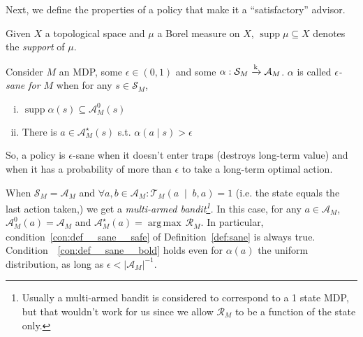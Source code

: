 \documentclass[anon,12pt]{colt2018} %
\DeclareMathOperator{\Supp}{supp}
\newcommand{\AP}[1]{\left(#1\right)}
\newcommand{\APM}[2]{\left(#1\;\middle\vert\;#2\right)}
\newcommand{\Argmax}[1]{\underset{#1}{\operatorname{arg\,max}}\,}
\newcommand{\Abs}[1]{\left\vert #1 \right\vert}
\newcommand{\K}{\xrightarrow{\textnormal{k}}}
\newcommand{\A}{\mathcal{A}}
\newcommand{\St}{\mathcal{S}}
\newcommand{\T}{\mathcal{T}}
\newcommand{\R}{\mathcal{R}}
\newcommand{\Ad}{\alpha}
\begin{document}
Next, we define the properties of a policy that make it a \enquote{satisfactory} advisor.

Given $X$ a topological space and $\mu$ a Borel measure on $X$, $\Supp{\mu} \subseteq X$ denotes the \emph{support} of $\mu$.

\begin{samepage}
\begin{definition}
\label{def:sane}

Consider $M$ an MDP, some $\epsilon\in(0,1)$ and some $\Ad: \St_M \K \A_M$. $\Ad$ is called \emph{$\epsilon$-sane for $M$} when for any $s \in \St_M$,

\begin{enumerate}[i.]
\item\label{con:def__sane__safe} $\Supp{\Ad(s)} \subseteq \A_M^0\AP{s}$
\item\label{con:def__sane__bold} There is $a \in \A_M^\star(s)$ s.t. $\Ad(a \mid s) > \epsilon$
\end{enumerate}

So, a policy is $\epsilon$-sane when it doesn't enter traps (destroys long-term value) and when it has a probability of more than $\epsilon$ to take a long-term optimal action.

\end{definition}
\end{samepage}

\begin{samepage}
\begin{example}

When $\St_M=\A_M$ and $\forall a,b \in \A_M: \T_M\APM{a}{b,a}=1$ (i.e. the state equals the last action taken,) we get a \emph{multi-armed bandit\footnote{Usually a multi-armed bandit is considered to correspond to a 1 state MDP, but that wouldn't work for us since we allow $\R_M$ to be a function of the state only.}.} In this case, for any $a\in\A_M$, $\A_M^0(a) = \A_M$ and $\A_M^\star(a)=\Argmax{}{\R_M}$. In particular, condition~\ref{con:def__sane__safe} of Definition~\ref{def:sane} is always true. Condition~~\ref{con:def__sane__bold} holds even for $\alpha(a)$ the uniform distribution, as long as $\epsilon < \Abs{\A_M}^{-1}$.

\end{example}
\end{samepage}
\end{document}
